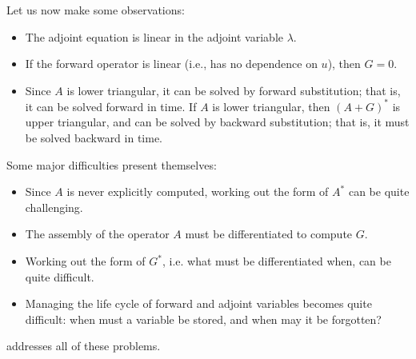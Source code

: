 Let us now make some observations:
\begin{itemize}
\item The adjoint equation is linear in the adjoint variable $\lambda$.
\item If the forward operator is linear (i.e., has no dependence on $u$), then $G = 0$.
\item Since $A$ is lower triangular, it can be solved by forward substitution; that is, it can be
solved forward in time. If $A$ is lower triangular, then $(A+G)^{*}$ is upper triangular, and can be solved
by backward substitution; that is, it must be solved backward in time.
\end{itemize}

Some major difficulties present themselves:
\begin{itemize}
\item Since $A$ is never explicitly computed, working out the form of $A^*$ can be quite challenging.
\item The assembly of the operator $A$ must be differentiated to compute $G$.
\item Working out the form of $G^*$, i.e. what must be differentiated when, can be quite difficult.
\item Managing the life cycle of forward and adjoint variables becomes quite difficult: when must a
variable be stored, and when may it be forgotten?
\end{itemize}

\libadjoint addresses all of these problems.
